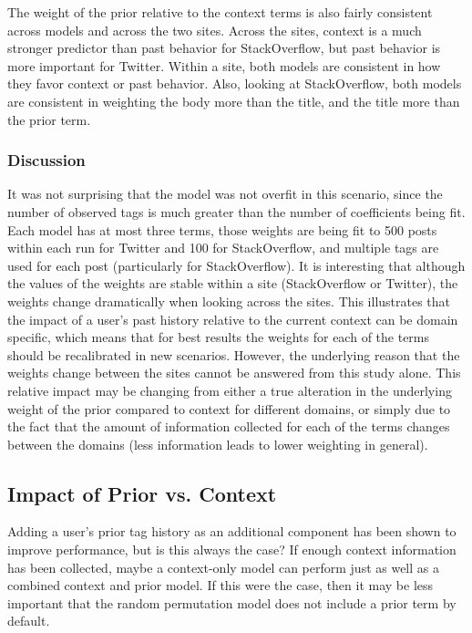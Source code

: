 \documentclass[man,floatsintext,donotrepeattitle]{apa6}
\begin{document}
The weight of the prior relative to the context terms is also fairly consistent across models and across the two sites.
Across the sites, context is a much stronger predictor than past behavior for StackOverflow, but past behavior is more important for Twitter. 
Within a site, both models are consistent in how they favor context or past behavior.
Also, looking at StackOverflow, both models are consistent in weighting the body more than the title, and the title more than the prior term.

\subsubsection{Discussion}

It was not surprising that the model was not overfit in this scenario, since the number of observed tags is much greater than the number of coefficients being fit.
Each model has at most three terms, those weights are being fit to 500 posts within each run for Twitter and 100 for StackOverflow, and multiple tags are used for each post (particularly for StackOverflow).
It is interesting that although the values of the weights are stable within a site (StackOverflow or Twitter), the weights change dramatically when looking across the sites.
This illustrates that the impact of a user's past history relative to the current context can be domain specific, which means that for best results the weights for each of the terms should be recalibrated in new scenarios.
However, the underlying reason that the weights change between the sites cannot be answered from this study alone.
This relative impact may be changing from either a true alteration in the underlying weight of the prior compared to context for different domains,
or simply due to the fact that the amount of information collected for each of the terms changes between the domains (less information leads to lower weighting in general). 

\subsection{Impact of Prior vs. Context}

Adding a user's prior tag history as an additional component has been shown to improve performance, but is this always the case?
If enough context information has been collected, maybe a context-only model can perform just as well as a combined context and prior model.
If this were the case, then it may be less important that the random permutation model does not include a prior term by default.
\end{document}
